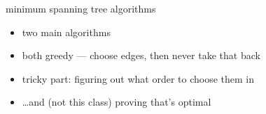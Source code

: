 \begin{frame}{minimum spanning tree algorithms}
    \begin{itemize}
    \item two main algorithms
    \item both greedy --- choose edges, then never take that back
    \item tricky part: figuring out what order to choose them in
    \item \ldots and (not this class) proving that's optimal
    \end{itemize}
\end{frame}

